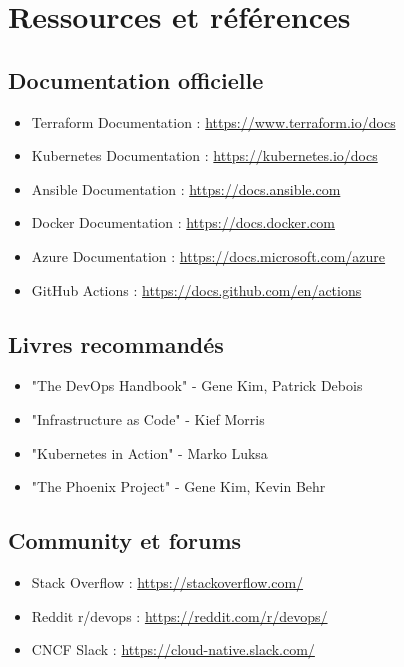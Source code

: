 \documentclass[12pt,a4paper,twoside]{report}
\begin{document}
\newpage

\chapter{Ressources et références}

\section{Documentation officielle}

\begin{itemize}
    \item Terraform Documentation : \url{https://www.terraform.io/docs}
    \item Kubernetes Documentation : \url{https://kubernetes.io/docs}
    \item Ansible Documentation : \url{https://docs.ansible.com}
    \item Docker Documentation : \url{https://docs.docker.com}
    \item Azure Documentation : \url{https://docs.microsoft.com/azure}
    \item GitHub Actions : \url{https://docs.github.com/en/actions}
\end{itemize}

\section{Livres recommandés}

\begin{itemize}
    \item "The DevOps Handbook" - Gene Kim, Patrick Debois
    \item "Infrastructure as Code" - Kief Morris
    \item "Kubernetes in Action" - Marko Luksa
    \item "The Phoenix Project" - Gene Kim, Kevin Behr
\end{itemize}

\section{Community et forums}

\begin{itemize}
    \item Stack Overflow : \url{https://stackoverflow.com/}
    \item Reddit r/devops : \url{https://reddit.com/r/devops/}
    \item CNCF Slack : \url{https://cloud-native.slack.com/}
\end{itemize}
\end{document}

